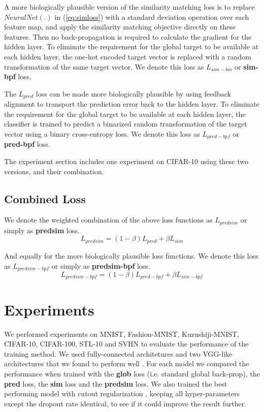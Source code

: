 \documentclass{article}
\begin{document}
A more biologically plausible version of the similarity matching loss is to replace $NeuralNet(.)$ in (\ref{eq:simloss}) with a standard deviation operation over each feature map, and apply the similarity matching objective directly on these features. Then no back-propagation is required to calculate the gradient for the hidden layer. To eliminate the requirement for the global target to be available at each hidden layer, the one-hot encoded target vector is replaced with a random transformation of the same target vector.  We denote this loss as $L_{sim-bio}$ or \textbf{sim-bpf} loss.

The $L_{pred}$ loss can be made more biologically plausible by using feedback alignment \cite{LillicrapCTA14} to transport the prediction error back to the hidden layer. To eliminate the requirement for the global target to be available at each hidden layer, the classifier is trained to predict a binarized random transformation of the target vector using a binary cross-entropy loss. We denote this loss as $L_{pred-bpf}$ or \textbf{pred-bpf} loss.

The experiment section includes one experiment on CIFAR-10 using these two versions, and their combination.

\subsection{Combined Loss}

We denote the weighted combination of the above loss functions as $L_{predsim}$ or simply as \textbf{predsim} loss.
\begin{equation}
L_{predsim} = (1-\beta)L_{pred} + \beta L_{sim}
\end{equation}

And equally for the more biologically plausible loss functions. We denote this loss as $L_{predsim-bpf}$ or simply as \textbf{predsim-bpf} loss.
\begin{equation}
L_{predsim-bpf} = (1-\beta)L_{pred-bpf} + \beta L_{sim-bpf}
\end{equation}

\section{Experiments}

We performed experiments on MNIST, Fashion-MNIST, Kuzushiji-MNIST, CIFAR-10, CIFAR-100, STL-10 and SVHN to evaluate the performance of the training method. We used fully-connected architetures and two VGG-like architectures that we found to perform well \cite{SimonyanZ14a}. For each model we compared the performance when trained with the \textbf{glob} loss (i.e. standard global back-prop), the \textbf{pred} loss, the \textbf{sim} loss and the \textbf{predsim} loss. We also trained the best performing model with cutout regularization \cite{DevriesT17}, keeping all hyper-parameters except the dropout rate identical, to see if it could improve the result further.
\end{document}
